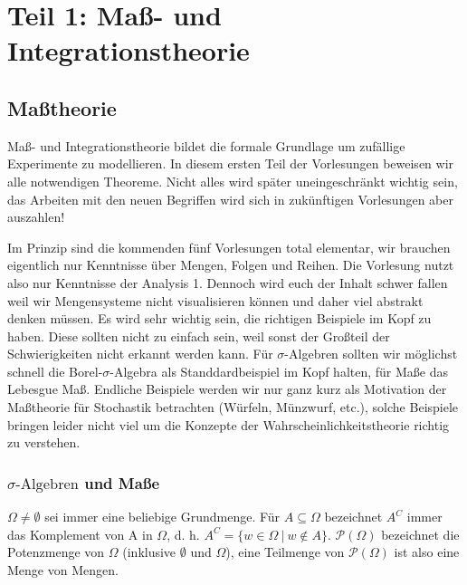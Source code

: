 
	\part*{Teil 1: Maß- und Integrationstheorie}


\chapter{Maßtheorie}

Ma\ss - und Integrationstheorie bildet die formale Grundlage um zuf\"allige Experimente zu modellieren. In diesem ersten Teil der Vorlesungen beweisen wir alle notwendigen Theoreme. Nicht alles wird sp\"ater uneingeschr\"ankt wichtig sein, das Arbeiten mit den neuen Begriffen wird sich in zuk\"unftigen Vorlesungen aber auszahlen! \smallskip

Im Prinzip sind die kommenden f\"unf Vorlesungen total elementar, wir brauchen eigentlich nur Kenntnisse \"uber Mengen, Folgen und Reihen. Die Vorlesung nutzt also nur Kenntnisse der Analysis 1. Dennoch wird euch der Inhalt schwer fallen weil wir Mengensysteme nicht visualisieren k\"onnen und daher viel abstrakt denken m\"ussen. Es wird sehr wichtig sein, die richtigen Beispiele im Kopf zu haben. Diese sollten nicht zu einfach sein, weil sonst der Gro\ss teil der Schwierigkeiten nicht erkannt werden kann. F\"ur $\sigma$-Algebren sollten wir m\"oglichst schnell die Borel-$\sigma$-Algebra als Standdardbeispiel im Kopf halten, f\"ur Ma\ss e das Lebesgue Ma\ss. Endliche Beispiele werden wir nur ganz kurz als Motivation der Ma\ss theorie f\"ur Stochastik betrachten (W\"urfeln, M\"unzwurf, etc.), solche Beispiele bringen leider nicht viel um die Konzepte der Wahrscheinlichkeitstheorie richtig zu verstehen.


\section{$\sigma\text{-Algebren}$ und Maße}\label{sigmaalgebra}
$\Omega \neq \emptyset $ sei immer eine beliebige Grundmenge. Für $A \subseteq \Omega$ bezeichnet $A^C$ immer das Komplement von A in $\Omega$, d. h. $A^C = \{ w \in \Omega \: | \: w \notin A \}$. $\mathcal{P}(\Omega)$ bezeichnet die Potenzmenge von $\Omega$ (inklusive $\emptyset$ und $\Omega$), eine Teilmenge von $\mathcal{P}(\Omega)$ ist also eine Menge von Mengen.

